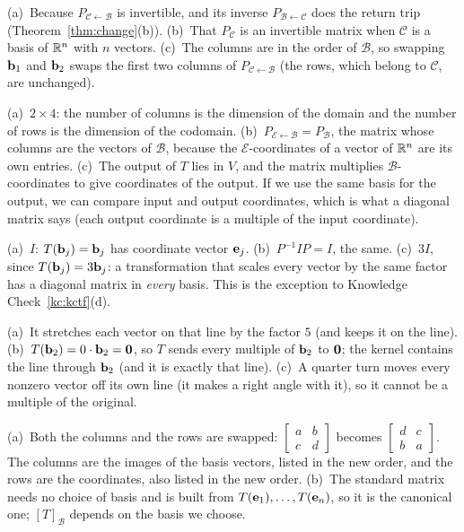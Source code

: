 \documentclass[11pt]{article}
\begin{document}
\begin{description}[leftmargin=0pt,itemsep=5pt]
  \item[Pause and think \ref{think:whyinv}.] (a)~Because $P_{\mathcal{C}\leftarrow\mathcal{B}}$ is invertible, and its inverse $P_{\mathcal{B}\leftarrow\mathcal{C}}$ does the return trip (Theorem~\ref{thm:change}(b)). (b)~That $P_{\mathcal{C}}$ is an invertible matrix when $\mathcal{C}$ is a basis of $\mathbb{R}^n$ with $n$ vectors. (c)~The columns are in the order of $\mathcal{B}$, so swapping $\mathbf{b}_1$ and $\mathbf{b}_2$ swaps the first two columns of $P_{\mathcal{C}\leftarrow\mathcal{B}}$ (the rows, which belong to $\mathcal{C}$, are unchanged).
  \item[Pause and think \ref{think:sizes}.] (a)~$2\times4$: the number of columns is the dimension of the domain and the number of rows is the dimension of the codomain. (b)~$P_{\mathcal{E}\leftarrow\mathcal{B}}=P_{\mathcal{B}}$, the matrix whose columns are the vectors of $\mathcal{B}$, because the $\mathcal{E}$-coordinates of a vector of $\mathbb{R}^n$ are its own entries. (c)~The output of $T$ lies in $V$, and the matrix multiplies $\mathcal{B}$-coordinates to give coordinates of the output. If we use the same basis for the output, we can compare input and output coordinates, which is what a diagonal matrix says (each output coordinate is a multiple of the input coordinate).
  \item[Pause and think \ref{think:ident}.] (a)~$I$: $T(\mathbf{b}_j)=\mathbf{b}_j$ has coordinate vector $\mathbf{e}_j$. (b)~$P^{-1}IP=I$, the same. (c)~$3I$, since $T(\mathbf{b}_j)=3\mathbf{b}_j$: a transformation that scales every vector by the same factor has a diagonal matrix in \emph{every} basis. This is the exception to Knowledge Check~\ref{kc:kctf}(d).
  \item[Pause and think \ref{think:scaledline}.] (a)~It stretches each vector on that line by the factor $5$ (and keeps it on the line). (b)~$T(\mathbf{b}_2)=0\cdot\mathbf{b}_2=\mathbf{0}$, so $T$ sends every multiple of $\mathbf{b}_2$ to $\mathbf{0}$; the kernel contains the line through $\mathbf{b}_2$ (and it is exactly that line). (c)~A quarter turn moves every nonzero vector off its own line (it makes a right angle with it), so it cannot be a multiple of the original.
  \item[Pause and think \ref{think:reorder}.] (a)~Both the columns and the rows are swapped: $\begin{bmatrix}a&b\\c&d\end{bmatrix}$ becomes $\begin{bmatrix}d&c\\b&a\end{bmatrix}$. The columns are the images of the basis vectors, listed in the new order, and the rows are the coordinates, also listed in the new order. (b)~The standard matrix needs no choice of basis and is built from $T(\mathbf{e}_1),\dots,T(\mathbf{e}_n)$, so it is the canonical one; $[T]_{\mathcal{B}}$ depends on the basis we choose.

\end{description}
\end{document}
